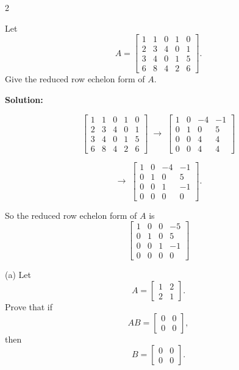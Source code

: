 \documentclass[8pt]{extarticle}
\begin{document}
\begin{multicols}{2}
\begin{tcolorbox}[title=Problem 9 — Original Statement and Solution]
\noindent
Let
\[
A =
\begin{bmatrix}
1 & 1 & 0 & 1 & 0\\
2 & 3 & 4 & 0 & 1\\
3 & 4 & 0 & 1 & 5\\
6 & 8 & 4 & 2 & 6
\end{bmatrix}.
\]
Give the reduced row echelon form of \(A\).

\bigskip
\noindent
\textbf{Solution:}

\[
\begin{bmatrix}
1 & 1 & 0 & 1 & 0\\
2 & 3 & 4 & 0 & 1\\
3 & 4 & 0 & 1 & 5\\
6 & 8 & 4 & 2 & 6
\end{bmatrix}
\;\to\;
\begin{bmatrix}
1 & 0 & -4 & -1\\
0 & 1 & 0 & 5\\
0 & 0 & 4 & 4\\
0 & 0 & 4 & 4
\end{bmatrix}
\]

\[
\to\;
\begin{bmatrix}
1 & 0 & -4 & -1\\
0 & 1 & 0 & 5\\
0 & 0 & 1 & -1\\
0 & 0 & 0 & 0
\end{bmatrix}.
\]

So the reduced row echelon form of \(A\) is
\[
\boxed{
\begin{bmatrix}
1 & 0 & 0 & -5\\
0 & 1 & 0 & 5\\
0 & 0 & 1 & -1\\
0 & 0 & 0 & 0
\end{bmatrix}}
\]
\end{tcolorbox}

\begin{tcolorbox}[title=Problem 10(a) — Original Statement and Solution]
\noindent
(a) Let
\[
A = \begin{bmatrix}1 & 2\\ 2 & 1\end{bmatrix}.
\]
Prove that if
\[
AB = \begin{bmatrix}0 & 0\\ 0 & 0\end{bmatrix},
\]
then
\[
B = \begin{bmatrix}0 & 0\\ 0 & 0\end{bmatrix}.
\]


\end{tcolorbox}
\end{multicols}
\end{document}
